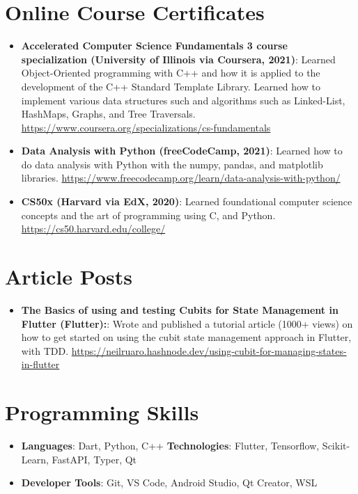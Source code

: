 \documentclass[letterpaper,11pt]{article}
\newcommand{\resumeItem}[2]{
  \item\small{
    \textbf{#1}{: #2 \vspace{-2pt}}
  }
}
\newcommand{\resumeSubItem}[2]{\resumeItem{#1}{#2}\vspace{-4pt}}
\newcommand{\resumeSubHeadingListStart}{\begin{itemize}[leftmargin=*]}
\newcommand{\resumeSubHeadingListEnd}{\end{itemize}}
\begin{document}
\section{Online Course Certificates}
\resumeSubHeadingListStart
\resumeSubItem{Accelerated Computer Science Fundamentals 3 course specialization (University of Illinois via Coursera, 2021)} {Learned Object-Oriented programming with C++ and how it is applied to the development of the C++ Standard Template Library.
Learned how to implement various data structures such and algorithms such as Linked-List, HashMaps, Graphs, and Tree
Traversals. \href{https://www.coursera.org/specializations/cs-fundamentals}{https://www.coursera.org/specializations/cs-fundamentals}}
\vspace{0.5mm}
\resumeSubItem
{Data Analysis with Python (freeCodeCamp, 2021)} {Learned how to do data analysis with Python with the numpy, pandas, and matplotlib libraries. \href{https://www.freecodecamp.org/learn/data-analysis-with-python/}{https://www.freecodecamp.org/learn/data-analysis-with-python/}}
\vspace{0.5mm}
\resumeSubItem
{CS50x (Harvard via EdX, 2020)} {Learned foundational computer science concepts and the art of programming using C, and
Python. \href{https://cs50.harvard.edu/college/}{https://cs50.harvard.edu/college/}}
\resumeSubHeadingListEnd

%
\section{Article Posts}
\resumeSubHeadingListStart
\resumeSubItem{The Basics of using and testing Cubits for State Management in Flutter (Flutter):} {Wrote and published a tutorial article
(1000+ views) on how to get started on using the cubit state management approach in Flutter, with TDD.  \href{https://neilruaro.hashnode.dev/using-cubit-for-managing-states-in-flutter}{https://neilruaro.hashnode.dev/using-cubit-for-managing-states-in-flutter}}
\resumeSubHeadingListEnd
%
\section{Programming Skills}
 \resumeSubHeadingListStart
   \item{
     \textbf{Languages}{: Dart, Python, C++}
     \hfill
     \textbf{Technologies}{: Flutter, Tensorflow, Scikit-Learn, FastAPI, Typer, Qt}
   }
   \item{\textbf{Developer Tools}{: Git, VS Code, Android Studio, Qt Creator, WSL}}
 \resumeSubHeadingListEnd


\end{document}
